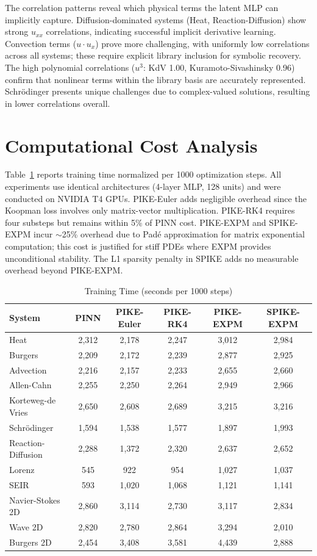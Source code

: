 \documentclass{article}
\theoremstyle{remark}
\begin{document}
The correlation patterns reveal which physical terms the latent MLP can implicitly capture. Diffusion-dominated systems (Heat, Reaction-Diffusion) show strong $u_{xx}$ correlations, indicating successful implicit derivative learning. Convection terms ($u \cdot u_x$) prove more challenging, with uniformly low correlations across all systems; these require explicit library inclusion for symbolic recovery. The high polynomial correlations ($u^3$: KdV 1.00, Kuramoto-Sivashinsky 0.96) confirm that nonlinear terms within the library basis are accurately represented. Schr\"odinger presents unique challenges due to complex-valued solutions, resulting in lower correlations overall.

\FloatBarrier
\section{Computational Cost Analysis}
\label{app:computational}

Table~\ref{tab:computational_cost} reports training time normalized per 1000 optimization steps. All experiments use identical architectures (4-layer MLP, 128 units) and were conducted on NVIDIA T4 GPUs. PIKE-Euler adds negligible overhead since the Koopman loss involves only matrix-vector multiplication. PIKE-RK4 requires four substeps but remains within 5\% of PINN cost. PIKE-EXPM and SPIKE-EXPM incur $\sim$25\% overhead due to Pad\'e approximation for matrix exponential computation; this cost is justified for stiff PDEs where EXPM provides unconditional stability. The L1 sparsity penalty in SPIKE adds no measurable overhead beyond PIKE-EXPM.

\begin{table}[H]
\centering
\caption{Training Time (seconds per 1000 steps)}
\label{tab:computational_cost}
\begin{tabular}{lccccc}
\toprule
System & PINN & PIKE-Euler & PIKE-RK4 & PIKE-EXPM & SPIKE-EXPM \\
\midrule
Heat & 2,312 & 2,178 & 2,247 & 3,012 & 2,984 \\
Burgers & 2,209 & 2,172 & 2,239 & 2,877 & 2,925 \\
Advection & 2,216 & 2,157 & 2,233 & 2,655 & 2,660 \\
Allen-Cahn & 2,255 & 2,250 & 2,264 & 2,949 & 2,966 \\
Korteweg-de Vries & 2,650 & 2,608 & 2,689 & 3,215 & 3,216 \\
Schr\"odinger & 1,594 & 1,538 & 1,577 & 1,897 & 1,993 \\
Reaction-Diffusion & 2,288 & 1,372 & 2,320 & 2,637 & 2,652 \\
Lorenz & 545 & 922 & 954 & 1,027 & 1,037 \\
SEIR & 593 & 1,020 & 1,068 & 1,121 & 1,141 \\
Navier-Stokes 2D & 2,860 & 3,114 & 2,730 & 3,117 & 2,834 \\
Wave 2D & 2,820 & 2,780 & 2,864 & 3,294 & 2,010 \\
Burgers 2D & 2,454 & 3,408 & 3,581 & 4,439 & 2,888 \\
\bottomrule
\end{tabular}
\end{table}
\end{document}
